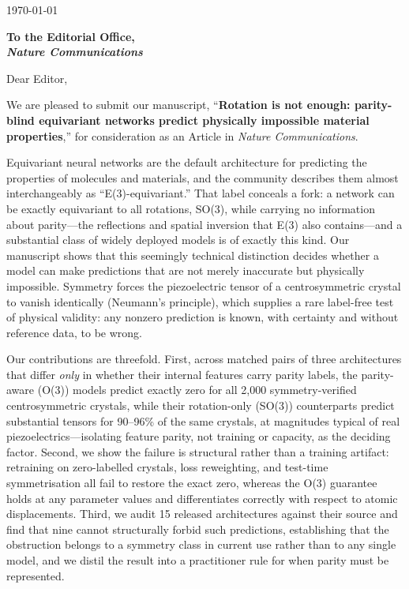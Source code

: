 \documentclass[11pt]{article}
\begin{document}
\begin{flushright}
\today
\end{flushright}

\textbf{To the Editorial Office, \\ \textit{Nature Communications}}

Dear Editor,

We are pleased to submit our manuscript, ``\textbf{Rotation is not enough: parity-blind equivariant networks predict physically impossible material properties},'' for consideration as an Article in \textit{Nature Communications}.

Equivariant neural networks are the default architecture for predicting the properties of molecules and materials, and the community describes them almost interchangeably as ``E(3)-equivariant.'' That label conceals a fork: a network can be exactly equivariant to all rotations, SO(3), while carrying no information about parity---the reflections and spatial inversion that E(3) also contains---and a substantial class of widely deployed models is of exactly this kind. Our manuscript shows that this seemingly technical distinction decides whether a model can make predictions that are not merely inaccurate but physically impossible. Symmetry forces the piezoelectric tensor of a centrosymmetric crystal to vanish identically (Neumann's principle), which supplies a rare label-free test of physical validity: any nonzero prediction is known, with certainty and without reference data, to be wrong.

Our contributions are threefold. First, across matched pairs of three architectures that differ \emph{only} in whether their internal features carry parity labels, the parity-aware (O(3)) models predict exactly zero for all 2,000 symmetry-verified centrosymmetric crystals, while their rotation-only (SO(3)) counterparts predict substantial tensors for 90--96\% of the same crystals, at magnitudes typical of real piezoelectrics---isolating feature parity, not training or capacity, as the deciding factor. Second, we show the failure is structural rather than a training artifact: retraining on zero-labelled crystals, loss reweighting, and test-time symmetrisation all fail to restore the exact zero, whereas the O(3) guarantee holds at any parameter values and differentiates correctly with respect to atomic displacements. Third, we audit 15 released architectures against their source and find that nine cannot structurally forbid such predictions, establishing that the obstruction belongs to a symmetry class in current use rather than to any single model, and we distil the result into a practitioner rule for when parity must be represented.
\end{document}
